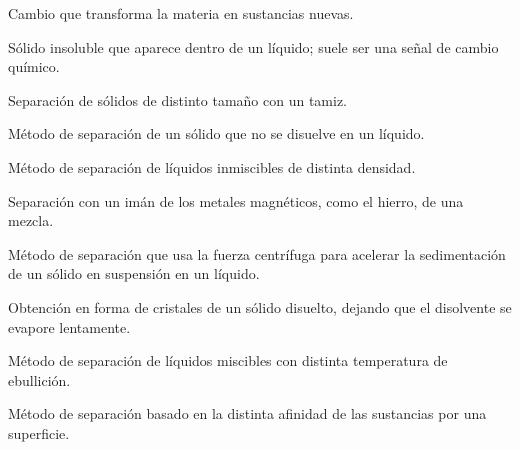 \begin{vocabulary}
    Cambio que transforma la materia en sustancias nuevas.
\end{vocabulary}

\begin{vocabulary}
    Sólido insoluble que aparece dentro de un líquido; suele ser una señal de cambio químico.
\end{vocabulary}

\begin{vocabulary}
    Separación de sólidos de distinto tamaño con un tamiz.
\end{vocabulary}

\begin{vocabulary}
    Método de separación de un sólido que no se disuelve en un líquido.
\end{vocabulary}

\begin{vocabulary}
    Método de separación de líquidos inmiscibles de distinta densidad.
\end{vocabulary}

\begin{vocabulary}
    Separación con un imán de los metales magnéticos, como el hierro, de una mezcla.
\end{vocabulary}

\begin{vocabulary}
    Método de separación que usa la fuerza centrífuga para acelerar la sedimentación de un sólido en suspensión en un líquido.
\end{vocabulary}

\begin{vocabulary}
    Obtención en forma de cristales de un sólido disuelto, dejando que el disolvente se evapore lentamente.
\end{vocabulary}

\begin{vocabulary}
    Método de separación de líquidos miscibles con distinta temperatura de ebullición.
\end{vocabulary}

\begin{vocabulary}
    Método de separación basado en la distinta afinidad de las sustancias por una superficie.
\end{vocabulary}
